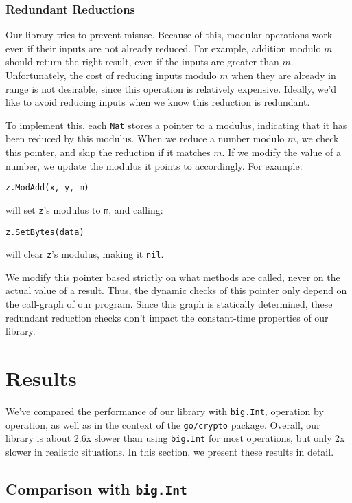 \documentclass[11pt, a4paper]{article} %
\begin{document}
{\subsubsection{Redundant Reductions}

Our library tries to prevent misuse. Because of this,
modular operations work even if their inputs are not already
reduced. For example, addition modulo $m$ should return the
right result, even if the inputs are greater than $m$.
Unfortunately, the cost of reducing inputs modulo $m$ when
they are already in range is not desirable, since this operation
is relatively expensive. Ideally, we'd like to avoid reducing
inputs when we know this reduction
is redundant.

To implement this, each \texttt{Nat} stores a pointer to a modulus,
indicating that it has been reduced by this modulus.
When we reduce a number modulo $m$, we check this pointer,
and skip the reduction if it matches $m$. If we modify
the value of a number, we update the modulus it points to
accordingly.
For example:
\begin{verbatim}
z.ModAdd(x, y, m)
\end{verbatim}
will set \texttt{z}'s modulus to \texttt{m}, and calling:
\begin{verbatim}
z.SetBytes(data)
\end{verbatim}
will clear \texttt{z}'s modulus, making it \texttt{nil}.

We modify this pointer based strictly on what methods are called,
never on the actual value of a result. Thus, the dynamic
checks of this pointer
only depend on the call-graph of our program.
Since this graph is statically determined, these redundant reduction
checks don't impact the constant-time properties of our library.

\section{Results}

We've compared the performance of our library
with \texttt{big.Int}, operation by operation, as well as in the
context of the \texttt{go/crypto} package.
Overall, our library is about 2.6x slower than using
\texttt{big.Int} for most operations,
but only 2x slower in realistic situations.
In this section, we
present these results in detail.

\subsection{Comparison with \texttt{big.Int}}

}
\end{document}
